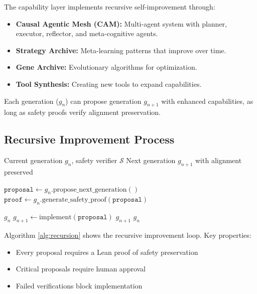 \documentclass[11pt,letterpaper]{article}
\begin{document}
The capability layer implements recursive self-improvement through:

\begin{itemize}
\item \textbf{Causal Agentic Mesh (CAM):} Multi-agent system with planner, executor, reflector, and meta-cognitive agents.
\item \textbf{Strategy Archive:} Meta-learning patterns that improve over time.
\item \textbf{Gene Archive:} Evolutionary algorithms for optimization.
\item \textbf{Tool Synthesis:} Creating new tools to expand capabilities.
\end{itemize}

Each generation ($g_n$) can propose generation $g_{n+1}$ with enhanced capabilities, as long as safety proofs verify alignment preservation.

\subsection{Recursive Improvement Process}

\begin{algorithm}[t]
\caption{Recursive Self-Improvement Loop}
\label{alg:recursion}
\begin{algorithmic}[1]
\Require Current generation $g_n$, safety verifier $\mathcal{S}$
\Ensure Next generation $g_{n+1}$ with alignment preserved

\State $\texttt{proposal} \gets g_n.\text{propose\_next\_generation}()$
\State $\texttt{proof} \gets g_n.\text{generate\_safety\_proof}(\texttt{proposal})$

            \State \Return $g_n$ 
        \EndIf
    \EndIf
    \State $g_{n+1} \gets \text{implement}(\texttt{proposal})$
    \State \Return $g_{n+1}$
\Else
    \State \Return $g_n$ 
\EndIf
\end{algorithmic}
\end{algorithm}

Algorithm \ref{alg:recursion} shows the recursive improvement loop. Key properties:
\begin{itemize}
\item Every proposal requires a Lean proof of safety preservation
\item Critical proposals require human approval
\item Failed verifications block implementation
\end{itemize}
\end{document}
